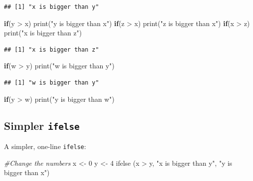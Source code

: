 \documentclass[
]{book}
\newenvironment{Shaded}{\begin{snugshade}}{\end{snugshade}}
\newcommand{\CommentTok}[1]{\textcolor[rgb]{0.56,0.35,0.01}{\textit{#1}}}
\newcommand{\ControlFlowTok}[1]{\textcolor[rgb]{0.13,0.29,0.53}{\textbf{#1}}}
\newcommand{\DecValTok}[1]{\textcolor[rgb]{0.00,0.00,0.81}{#1}}
\newcommand{\FunctionTok}[1]{\textcolor[rgb]{0.00,0.00,0.00}{#1}}
\newcommand{\NormalTok}[1]{#1}
\newcommand{\OtherTok}[1]{\textcolor[rgb]{0.56,0.35,0.01}{#1}}
\newcommand{\SpecialCharTok}[1]{\textcolor[rgb]{0.00,0.00,0.00}{#1}}
\newcommand{\StringTok}[1]{\textcolor[rgb]{0.31,0.60,0.02}{#1}}
\begin{document}
\begin{verbatim}
## [1] "x is bigger than y"
\end{verbatim}

\begin{Shaded}
\begin{Highlighting}[]
\ControlFlowTok{if}\NormalTok{(y }\SpecialCharTok{\textgreater{}}\NormalTok{ x) }\FunctionTok{print}\NormalTok{(}\StringTok{"y is bigger than x"}\NormalTok{)}
\ControlFlowTok{if}\NormalTok{(z }\SpecialCharTok{\textgreater{}}\NormalTok{ x) }\FunctionTok{print}\NormalTok{(}\StringTok{"z is bigger than x"}\NormalTok{)}
\ControlFlowTok{if}\NormalTok{(x }\SpecialCharTok{\textgreater{}}\NormalTok{ z) }\FunctionTok{print}\NormalTok{(}\StringTok{"x is bigger than z"}\NormalTok{)}
\end{Highlighting}
\end{Shaded}

\begin{verbatim}
## [1] "x is bigger than z"
\end{verbatim}

\begin{Shaded}
\begin{Highlighting}[]
\ControlFlowTok{if}\NormalTok{(w }\SpecialCharTok{\textgreater{}}\NormalTok{ y) }\FunctionTok{print}\NormalTok{(}\StringTok{"w is bigger than y"}\NormalTok{)}
\end{Highlighting}
\end{Shaded}

\begin{verbatim}
## [1] "w is bigger than y"
\end{verbatim}

\begin{Shaded}
\begin{Highlighting}[]
\ControlFlowTok{if}\NormalTok{(y }\SpecialCharTok{\textgreater{}}\NormalTok{ w) }\FunctionTok{print}\NormalTok{(}\StringTok{"y is bigger than w"}\NormalTok{)}
\end{Highlighting}
\end{Shaded}

\hypertarget{simpler-ifelse}{%
\subsection{\texorpdfstring{Simpler \texttt{ifelse}}{Simpler ifelse}}\label{simpler-ifelse}}

A simpler, one-line \texttt{ifelse}:

\begin{Shaded}
\begin{Highlighting}[]
\CommentTok{\#Change the numbers}
\NormalTok{x }\OtherTok{\textless{}{-}} \DecValTok{0}
\NormalTok{y }\OtherTok{\textless{}{-}} \DecValTok{4}
\FunctionTok{ifelse}\NormalTok{ (x }\SpecialCharTok{\textgreater{}}\NormalTok{ y, }\StringTok{"x is bigger than y"}\NormalTok{, }\StringTok{"y is bigger than x"}\NormalTok{)}
\end{Highlighting}
\end{Shaded}
\end{document}
